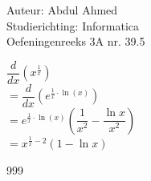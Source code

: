 \documentclass[a4paper]{article}
\begin{document}
  
\noindent \large Auteur: Abdul Ahmed \\
\noindent \large Studierichting:  Informatica\\
\noindent \large Oefeningenreeks 3A nr. 39.5\\

\medskip

\normalsize

 
$\dfrac{d}{dx} \left(x^{\tfrac{1}{x}}\right)$\\

$=\dfrac{d}{dx} \left(e^ {\tfrac{1}{x} \cdot\ln(x)}\right)$\\

$=e^ {\tfrac{1}{x} \cdot\ln(x)} \left(\dfrac{1}{x^2} - \dfrac{\ln x}{x^2}\right)$\\

$=x^{\tfrac{1}{x}-2}(1-\ln x)$\\



\begin{thebibliography}{999}
\end{thebibliography}
\end{document}
